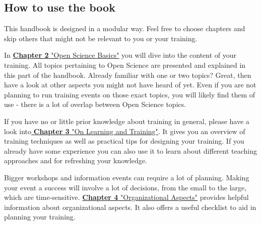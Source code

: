 \documentclass{article}
\begin{document}
\subsection{How to use the book}\label{how-to-use-the-book}



This handbook is designed in a modular way. Feel free to choose chapters and skip others that might not be relevant to you or your training.


In \textbf{\href{https://github.com/Open-Science-Training-Handbook/Open-Science-Training-Handbook_EN/tree/master/02OpenScienceBasics}{Chapter 2}}\href{https://github.com/Open-Science-Training-Handbook/Open-Science-Training-Handbook_EN/tree/master/02OpenScienceBasics}{ "Open Science Basics"} you will dive into the content of your training. All topics pertaining to Open Science are presented and explained in this part of the handbook. Already familiar with one or two topics? Great, then have a look at other aspects you might not have heard of yet. Even if you are not planning to run training events on those exact topics, you will likely find them of use - there is a lot of overlap between Open Science topics.


If you have no or little prior knowledge about training in general, please have a look into\href{https://github.com/Open-Science-Training-Handbook/Open-Science-Training-Handbook_EN/tree/master/03OnLearningAndTraining}{ }\textbf{\href{https://github.com/Open-Science-Training-Handbook/Open-Science-Training-Handbook_EN/tree/master/03OnLearningAndTraining}{Chapter 3}}\href{https://github.com/Open-Science-Training-Handbook/Open-Science-Training-Handbook_EN/tree/master/03OnLearningAndTraining}{ "On Learning and Training"}. It gives you an overview of training techniques as well as practical tips for designing your training. If you already have some experience you can also use it to learn about different teaching approaches and for refreshing your knowledge.


Bigger workshops and information events can require a lot of planning. Making your event a success will involve a lot of decisions, from the small to the large, which are time-sensitive. \textbf{\href{https://github.com/Open-Science-Training-Handbook/Open-Science-Training-Handbook_EN/tree/master/04OrganizationalAspects}{Chapter 4}}\href{https://github.com/Open-Science-Training-Handbook/Open-Science-Training-Handbook_EN/tree/master/04OrganizationalAspects}{ "Organizational Aspects"} provides helpful information about organizational aspects. It also offers a useful checklist to aid in planning your training.
\end{document}
